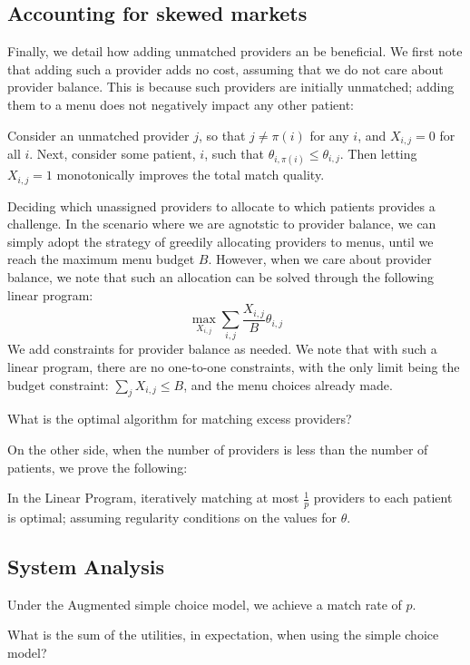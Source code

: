 \subsection{Accounting for skewed markets}
Finally, we detail how adding unmatched providers an be beneficial. 
We first note that adding such a provider adds no cost, assuming that we do not care about provider balance. 
This is because such providers are initially unmatched; adding them to a menu does not negatively impact any other patient: 
\begin{lemma}
    Consider an unmatched provider $j$, so that $j \neq \pi(i)$ for any $i$, and $X_{i,j} = 0$ for all $i$.  
    Next, consider some patient, $i$, such that $\theta_{i,\pi(i)} \leq \theta_{i,j}$. 
    Then letting $X_{i,j} = 1$ monotonically improves the total match quality. 
\end{lemma}
Deciding which unassigned providers to allocate to which patients provides a challenge. 
In the scenario where we are agnotstic to provider balance, we can simply adopt the strategy of greedily allocating providers to menus, until we reach the maximum menu budget $B$. 
However, when we care about provider balance, we note that such an allocation can be solved through the following linear program: 
\begin{equation}
    \max_{X_{i,j}} \sum_{i,j} \frac{X_{i,j}}{B} \theta_{i,j}
\end{equation}
We add constraints for provider balance as needed. 
We note that with such a linear program, there are no one-to-one constraints, with the only limit being the budget constraint: 
$\sum_{j} X_{i,j} \leq B$, and the menu choices already made. 
\begin{question}
    What is the optimal algorithm for matching excess providers? 
\end{question}

On the other side, when the number of providers is less than the number of patients, we prove the following: 
\begin{lemma}
    In the Linear Program, iteratively matching at most $\frac{1}{p}$ providers to each patient is optimal; assuming regularity conditions on the values for $\theta$. 
\end{lemma}

\subsection{System Analysis}
\begin{lemma} 
    Under the Augmented simple choice model, we achieve a match rate of $p$. 
\end{lemma}

\begin{question} 
    What is the sum of the utilities, in expectation, when using the simple choice model? 
\end{question}